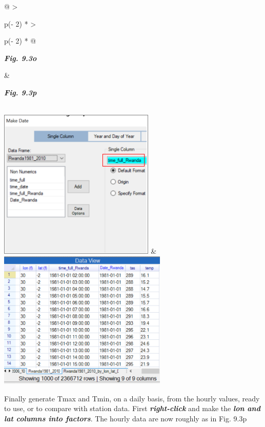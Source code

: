 \documentclass[
  letterpaper,
  DIV=11,
  numbers=noendperiod]{scrreprt}
\begin{document}
\begin{longtable}[]{@{}
  >{\raggedright\arraybackslash}p{(\columnwidth - 2\tabcolsep) * }
  >{\raggedright\arraybackslash}p{(\columnwidth - 2\tabcolsep) * }@{}}
\toprule\noalign{}
\begin{minipage}[b]{\linewidth}\raggedright
\textbf{\emph{Fig. 9.3o}}
\end{minipage} & \begin{minipage}[b]{\linewidth}\raggedright
\textbf{\emph{Fig. 9.3p}}
\end{minipage} \\
\midrule\noalign{}
\endhead
\bottomrule\noalign{}
\endlastfoot
\includegraphics[width=2.93324in,height=2.8244in]{figures/Fig9.3o.png} &
\includegraphics[width=3.16845in,height=2.59489in]{figures/Fig9.3p.png} \\
\end{longtable}

Finally generate Tmax and Tmin, on a daily basis, from the hourly
values, ready to use, or to compare with station data. First
\textbf{\emph{right-click}} and make the \textbf{\emph{lon and lat
columns into factors}}. The hourly data are now roughly as in Fig. 9.3p
\end{document}
